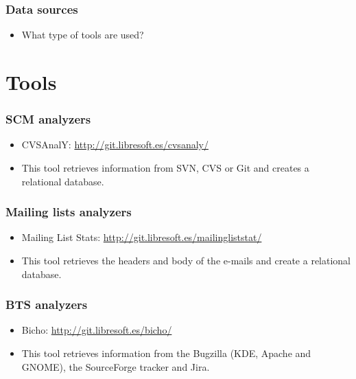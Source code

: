 \documentclass{beamer}
\begin{document}

\begin{frame}
 \frametitle{Data sources}
 \begin{itemize}
 \item What type of tools are used?
 \end{itemize}
\end{frame}



\section{Tools}



\begin{frame}
 \frametitle{SCM analyzers}
 \begin{itemize}
  \item CVSAnalY: \url{http://git.libresoft.es/cvsanaly/}
  \item This tool retrieves information from SVN, CVS or Git and 
  creates a relational database.
 \end{itemize}
\end{frame}


\begin{frame}
 \frametitle{Mailing lists analyzers}
 \begin{itemize}
 \item Mailing List Stats: \url{http://git.libresoft.es/mailingliststat/}
 \item This tool retrieves the headers and body of the e-mails and
 create a relational database.
 \end{itemize}
\end{frame}



\begin{frame}
 \frametitle{BTS analyzers}
 \begin{itemize}
 \item Bicho: \url{http://git.libresoft.es/bicho/}
 \item This tool retrieves information from the Bugzilla (KDE, Apache and GNOME),
 the SourceForge tracker and Jira. 
 \end{itemize}


\end{frame}
\end{document}
